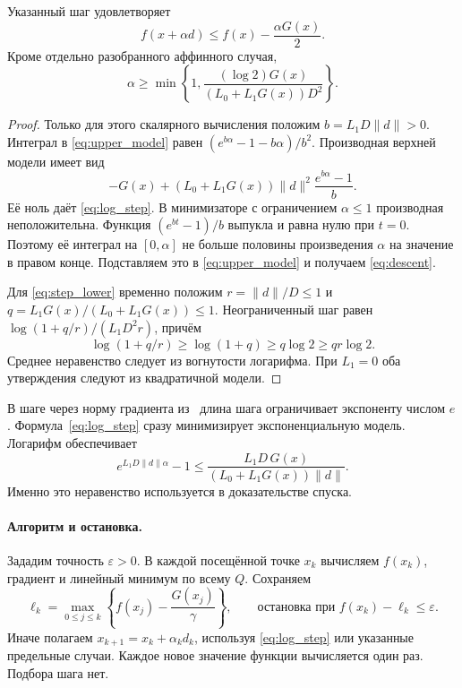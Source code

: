 \begin{lemma}[Спуск]\label{lem:descent}
Указанный шаг удовлетворяет
\begin{equation}\label{eq:descent}
 f(x+\alpha d)\le f(x)-\frac{\alpha G(x)}2.
\end{equation}
Кроме отдельно разобранного аффинного случая,
\begin{equation}\label{eq:step_lower}
 \alpha\ge
 \min\left\{1,
   \frac{(\log2)G(x)}{(L_0+L_1G(x))D^2}\right\}.
\end{equation}
\end{lemma}
\begin{proof}
Только для этого скалярного вычисления положим
$b=L_1D\|d\|>0$. Интеграл в \eqref{eq:upper_model} равен
$(e^{b\alpha}-1-b\alpha)/b^2$.
Производная верхней модели имеет вид
\[
 -G(x)+(L_0+L_1G(x))\|d\|^2
             \frac{e^{b\alpha}-1}{b}.
\]
Её ноль даёт \eqref{eq:log_step}. В минимизаторе с ограничением
$\alpha\le1$ производная неположительна.
Функция $(e^{bt}-1)/b$ выпукла и равна нулю при $t=0$.
Поэтому её интеграл на $[0,\alpha]$ не больше половины произведения
$\alpha$ на значение в правом конце. Подставляем это в
\eqref{eq:upper_model} и получаем \eqref{eq:descent}.

Для \eqref{eq:step_lower} временно положим
$r=\|d\|/D\le1$ и $q=L_1G(x)/(L_0+L_1G(x))\le1$.
Неограниченный шаг равен $\log(1+q/r)/(L_1D^2r)$, причём
\[
 \log(1+q/r)\ge\log(1+q)\ge q\log2\ge qr\log2.
\]
Среднее неравенство следует из вогнутости логарифма.
При $L_1=0$ оба утверждения следуют из квадратичной модели.
\end{proof}

В шаге через норму градиента из~\cite{vyguzov} длина шага
ограничивает экспоненту числом $e$. Формула~\eqref{eq:log_step}
сразу минимизирует экспоненциальную модель. Логарифм обеспечивает
\[
 e^{L_1D\|d\|\alpha}-1
 \le\frac{L_1D\,G(x)}{(L_0+L_1G(x))\|d\|}.
\]
Именно это неравенство используется в доказательстве спуска.

\paragraph{Алгоритм и остановка.}
Зададим точность $\varepsilon>0$.
В каждой посещённой точке $x_k$ вычисляем $f(x_k)$, градиент
и линейный минимум по всему $Q$. Сохраняем
\begin{equation}\label{eq:stop}
 \ell_k=\max_{0\le j\le k}
        \left\{f(x_j)-\frac{G(x_j)}{\gamma}\right\},
 \qquad \text{остановка при } f(x_k)-\ell_k\le\varepsilon.
\end{equation}
Иначе полагаем $x_{k+1}=x_k+\alpha_kd_k$, используя
\eqref{eq:log_step} или указанные предельные случаи.
Каждое новое значение функции вычисляется один раз. Подбора шага нет.
